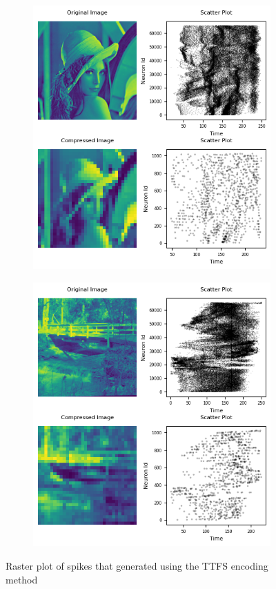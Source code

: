 \documentclass[12pt]{article}
\begin{document}
\begin{figure}[H]
\centering
  \begin{subfigure}[b]{0.45\textwidth}
    \includegraphics[width=\textwidth]{Figs/ttfs_lena.png}
  \end{subfigure}
  \hfill
  \begin{subfigure}[b]{0.45\textwidth}
    \includegraphics[width=\textwidth]{Figs/ttfs_bridge.png}
  \end{subfigure}
  \caption{Raster plot of spikes that generated using the TTFS encoding method}
  \label{Fig:ttfs_res}
\end{figure}
\end{document}
